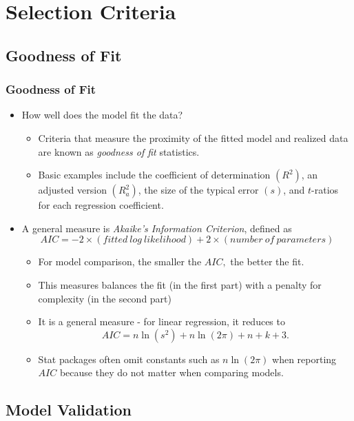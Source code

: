 \section{Selection Criteria}

\subsection{Goodness of Fit}

\begin{frame}%
 \frametitle{Goodness of Fit}
 \begin{itemize}
   \item How well does the model fit the data?
    \begin{itemize}
   \item Criteria that measure the
proximity of the fitted model and realized data are known as
\emph{goodness of fit} statistics.
\item Basic examples include the coefficient of determination
$(R^{2})$, an adjusted version $(R_{a}^{2})$, the size of the
typical error $(s)$, and $t$-ratios for each regression coefficient.
\end{itemize}
\item A general measure is \emph{Akaike's Information Criterion},
defined as
\begin{equation*}
AIC = -2 \times (fitted~log~likelihood) + 2 \times
(number~of~parameters)
\end{equation*}
\begin{itemize}
\item For model comparison, the smaller the $AIC,$ the
better the fit.
\item This measures balances the fit (in the first part) with a
penalty for complexity (in the second part)
\item It is a general measure - for linear regression, it
reduces to
\begin{equation*}
AIC = n \ln (s^2) + n \ln (2 \pi) +n +k + 3 .
\end{equation*}
\item Stat packages often omit constants such as $n \ln (2 \pi)$
when reporting $AIC$ because they do not matter when comparing
models.
    \end{itemize} \end{itemize}
\end{frame}

\subsection{Model Validation}


